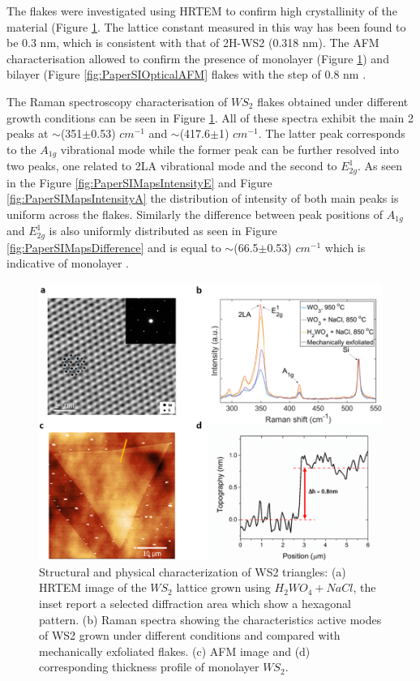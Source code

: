 \documentclass[12pt]{article}
\begin{document}

The flakes were investigated using HRTEM to confirm high crystallinity of the material (Figure \ref{fig:PaperAFM}. The lattice constant measured in this way has been found to be 0.3 nm, which is consistent with that of 2H-WS2 (0.318 nm). The AFM characterisation allowed to confirm the presence of monolayer (Figure \ref{fig:PaperAFM}) and bilayer (Figure \ref{fig:PaperSIOpticalAFM} flakes with the step of 0.8 nm \cite{Wu2014}\cite{Rasmussen2015}.

The Raman spectroscopy characterisation of $WS_2$ flakes obtained under different growth conditions can be seen in Figure \ref{fig:PaperAFM}. All of these spectra exhibit the main 2 peaks at {$\sim$}(351{$\pm$}0.53) $cm^{−1}$ and {$\sim$}(417.6{$\pm$}1) $cm^{−1}$. The latter peak corresponds to the $A_{1g}$ vibrational mode while the former peak can be further resolved into two peaks, one related to 2LA vibrational mode and the second to $E^1_{2g}$. As seen in the Figure \ref{fig:PaperSIMapsIntensityE} and Figure \ref{fig:PaperSIMapsIntensityA} the distribution of intensity of both main peaks is uniform across the flakes. Similarly the difference between peak positions of $A_{1g}$ and $E^1_{2g}$ is also uniformly distributed as seen in Figure \ref{fig:PaperSIMapsDifference} and is equal to {$\sim$}(66.5{$\pm$}0.53) $cm^{−1}$ which is indicative of monolayer \cite{Withers2014}.

\begin{figure}[h]
\begin{center}
\includegraphics[scale=0.3]{PaperAFM.png}
\caption{Structural and physical characterization of WS2 triangles: (a) HRTEM image of the $WS_2$ lattice grown using $H_2WO_4+NaCl$, the inset report a selected diffraction area which show a hexagonal pattern. (b) Raman spectra showing the characteristics active modes of WS2 grown under different conditions and compared with mechanically exfoliated flakes. (c) AFM image and (d) corresponding thickness profile of monolayer $WS_2$.}
\label{fig:PaperAFM}
\end{center}
\end{figure}
\end{document}
